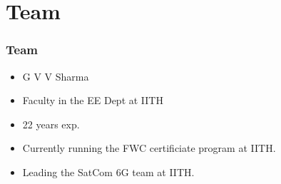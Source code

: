 \documentclass{beamer}
\theoremstyle{remark}
\begin{document}
\section{Team}
\begin{frame}
\frametitle{Team}
\begin{itemize}
\item G V V   Sharma
\item Faculty in the EE Dept at IITH
\item 22 years exp. 
\item Currently running the FWC certificiate program at IITH.
\item Leading the SatCom 6G team at IITH.  
\end{itemize}
\end{frame}
%
%  
%
%
\end{document}
